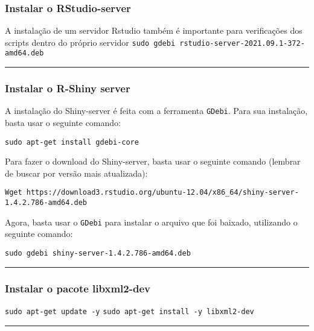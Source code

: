 \documentclass[
]{article}
\begin{document}
\hypertarget{instalar-o-rstudio-server}{%
\subsubsection{Instalar o
RStudio-server}\label{instalar-o-rstudio-server}}

A instalação de um servidor Rstudio também é importante para
verificações dos scripts dentro do próprio servidor
\texttt{sudo\ gdebi\ rstudio-server-2021.09.1-372-amd64.deb}

\begin{center}\rule{0.5\linewidth}{0.5pt}\end{center}

\hypertarget{instalar-o-r-shiny-server}{%
\subsubsection{Instalar o R-Shiny
server}\label{instalar-o-r-shiny-server}}

A instalação do Shiny-server é feita com a ferramenta \texttt{GDebi}.
Para sua instalação, basta usar o seguinte comando:

\texttt{sudo\ apt-get\ install\ gdebi-core}

Para fazer o download do Shiny-server, basta usar o seguinte comando
(lembrar de buscar por versão mais atualizada):

\texttt{Wget\ https://download3.rstudio.org/ubuntu-12.04/x86\_64/shiny-server-1.4.2.786-amd64.deb}

Agora, basta usar o \texttt{GDebi} para instalar o arquivo que foi
baixado, utilizando o seguinte comando:

\texttt{sudo\ gdebi\ shiny-server-1.4.2.786-amd64.deb}

\begin{center}\rule{0.5\linewidth}{0.5pt}\end{center}

\hypertarget{instalar-o-pacote-libxml2-dev}{%
\subsubsection{Instalar o pacote
libxml2-dev}\label{instalar-o-pacote-libxml2-dev}}

\texttt{sudo\ apt-get\ update\ -y}
\texttt{sudo\ apt-get\ install\ -y\ libxml2-dev}

\begin{center}\rule{0.5\linewidth}{0.5pt}\end{center}
\end{document}
